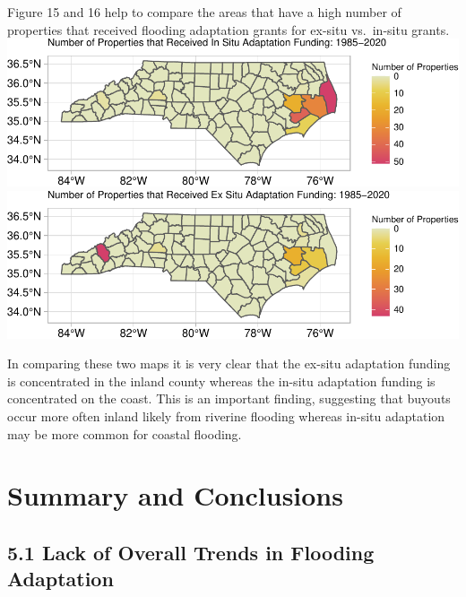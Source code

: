 \documentclass[
  12pt,
]{article}
\begin{document}
Figure 15 and 16 help to compare the areas that have a high number of
properties that received flooding adaptation grants for ex-situ
vs.~in-situ grants. \newline
\includegraphics{finalreport_files/figure-latex/unnamed-chunk-26-1.pdf}
\newline
\includegraphics{finalreport_files/figure-latex/unnamed-chunk-27-1.pdf}

In comparing these two maps it is very clear that the ex-situ adaptation
funding is concentrated in the inland county whereas the in-situ
adaptation funding is concentrated on the coast. This is an important
finding, suggesting that buyouts occur more often inland likely from
riverine flooding whereas in-situ adaptation may be more common for
coastal flooding.

\newpage

\hypertarget{summary-and-conclusions}{%
\section{Summary and Conclusions}\label{summary-and-conclusions}}

\hypertarget{lack-of-overall-trends-in-flooding-adaptation}{%
\subsection{5.1 Lack of Overall Trends in Flooding
Adaptation}\label{lack-of-overall-trends-in-flooding-adaptation}}
\end{document}
